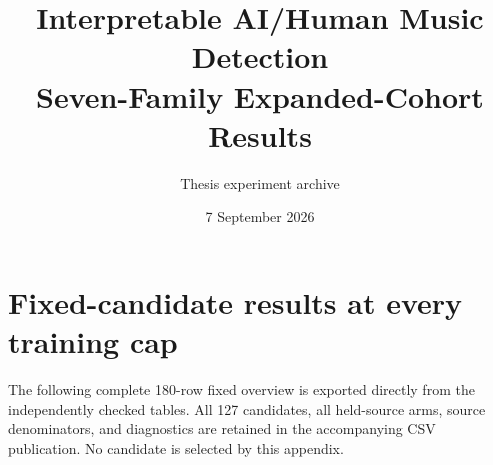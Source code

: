 \documentclass[10pt,a4paper]{article}
\title{Interpretable AI/Human Music Detection\\\large Seven-Family Expanded-Cohort Results}
\author{Thesis experiment archive}\date{7 September 2026}
\begin{document}
\maketitle

\clearpage
\appendix
\section{Fixed-candidate results at every training cap}
The following complete 180-row fixed overview is exported directly from the
independently checked tables. All 127 candidates, all held-source arms, source
denominators, and diagnostics are retained in the accompanying CSV publication.
No candidate is selected by this appendix.

\end{document}
